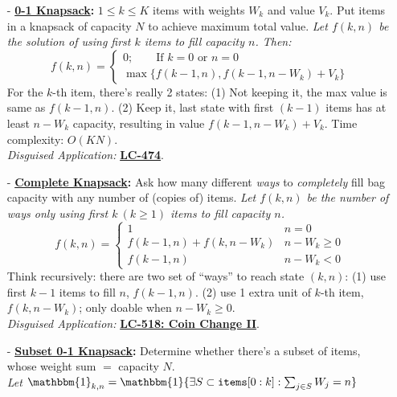 \documentclass[9pt, landscape]{article}
\begin{document}
\begin{multicols*}{3}
\begin{itemize}
	\begin{itemize}[leftmargin=10pt,noitemsep,topsep=0pt,partopsep=0pt]
		\item[-] \textbf{\href{https://labuladong.gitbook.io/algo/dong-tai-gui-hua-xi-lie/bei-bao-wen-ti}{0-1 Knapsack}:} $1\leq k\leq K$ items with weights $W_k$ and value $V_k$. Put items in a knapsack of capacity $N$ to achieve maximum total value. \textit{Let $f(k, n)$ be the solution of using first $k$ items to fill capacity $n$. Then:}
		$$
		f(k, n) = \begin{cases}
		0;\qquad \text{If }k=0 \text{ or } n=0 \\
		\max\{f(k-1, n), f(k-1, n-W_k) + V_k\}
		\end{cases}
		$$
		For the $k$-th item, there's really 2 states: (1) Not keeping it, the max value is same as $f(k-1, n)$. (2) Keep it, last state with first $(k-1)$ items has at least $n-W_k$ capacity, resulting in value $f(k-1, n-W_k)+V_k$. Time complexity: $O(KN)$. \\
		\emph{Disguised Application: } \textbf{\href{https://leetcode.com/problems/ones-and-zeroes/submissions/}{LC-474}}.
		\item[-] \textbf{\href{https://labuladong.gitbook.io/algo/dong-tai-gui-hua-xi-lie/bei-bao-ling-qian}{Complete Knapsack}:} Ask how many different \emph{ways} to \textit{completely} fill bag capacity with any number of (copies of) items. \textit{Let $f(k, n)$ be the number of ways only using first $k~(k\geq 1)$ items to fill capacity $n$. }
		$$
		f(k, n) = \begin{cases}
		1 & n=0\\
		f(k-1, n) + f(k, n-W_k) & n-W_k \geq 0 \\
		f(k-1, n) & n-W_k < 0
		\end{cases}
		$$
		Think recursively: there are two set of ``ways'' to reach state $(k, n)$: (1) use first $k-1$ items to fill $n$, $f(k-1, n)$. (2) use 1 extra unit of $k$-th item, $f(k, n-W_k)$; only doable when $n-W_k\geq 0$. \\
		\emph{Disguised Application: } \textbf{\href{https://leetcode.com/problems/coin-change-2/submissions/}{LC-518: Coin Change II}}.
		\item[-] \textbf{\href{https://labuladong.gitbook.io/algo/dong-tai-gui-hua-xi-lie/bei-bao-zi-ji}{Subset 0-1 Knapsack}:} Determine whether there's a subset of items, whose weight sum $=$ capacity $N$. \\
		\textit{Let $\mathbbm{1}_{k,n} = \mathbbm{1}\{\exists S\subset \texttt{items}[0:k]: \sum_{j\in S} W_j = n\}$}

\end{itemize}
\end{itemize}
\end{multicols*}
\end{document}
